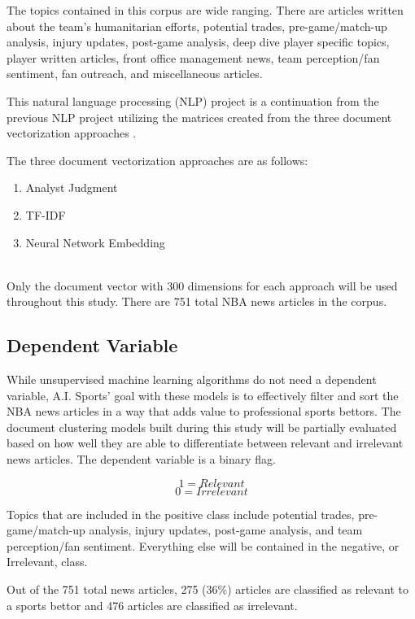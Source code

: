 \documentclass[5p,authoryear]{elsarticle}
\begin{document}
The topics contained in this corpus are wide ranging. There are articles written about the team's humanitarian efforts, potential trades, pre-game/match-up analysis, injury updates, post-game analysis, deep dive player specific topics, player written articles, front office management news, team perception/fan sentiment, fan outreach, and miscellaneous articles.

This natural language processing (NLP) project is a continuation from the previous NLP project utilizing the matrices created from the three document vectorization approaches \citep{project2}. 

The three document vectorization approaches are as follows: 

\begin{enumerate}
 \item Analyst Judgment
 \item TF-IDF
 \item Neural Network Embedding
\end{enumerate} \\

Only the document vector with 300 dimensions for each approach will be used throughout this study.
There are 751 total NBA news articles in the corpus.


\subsection{Dependent Variable}\label{dependent}

While unsupervised machine learning algorithms do not need a dependent variable, A.I. Sports' goal with these models is to effectively filter and sort the NBA news articles in a way that adds value to professional sports bettors. 
The document clustering models built during this study will be partially evaluated based on how well they are able to differentiate between relevant and irrelevant news articles. The dependent variable is a binary flag. 

$$1 = Relevant$$
$$0 = Irrelevant$$

Topics that are included in the positive class include potential trades, pre-game/match-up analysis, injury updates, post-game analysis, and team perception/fan sentiment. Everything else will be contained in the negative, or Irrelevant, class.

Out of the 751 total news articles, 275 (36\%) articles are classified as relevant to a sports bettor and 476 articles are classified as irrelevant. 
\end{document}

